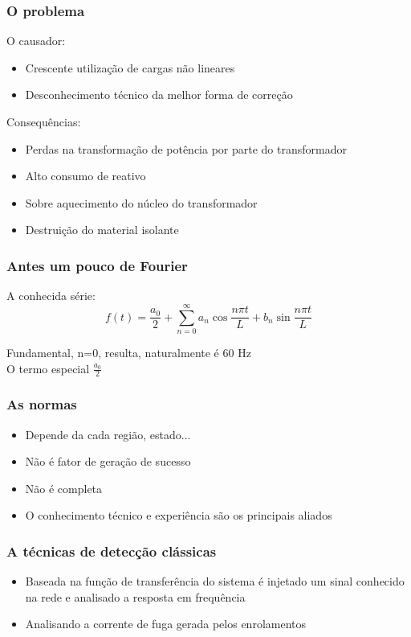 \documentclass{beamer}
\begin{document}
\begin{frame}
    \frametitle{O problema}

    O causador:
    \begin{itemize}
        \item Crescente utilização de cargas não lineares
        \item Desconhecimento técnico da melhor forma de correção
    \end{itemize}

    Consequências:
    \begin{itemize}
        \item Perdas na transformação de potência por parte do transformador
        \item Alto consumo de reativo
        \item Sobre aquecimento do núcleo do transformador
        \item Destruição do material isolante
    \end{itemize}

\end{frame}

\begin{frame}
    \frametitle{Antes um pouco de Fourier}

    A conhecida série:
    \begin{equation}
        f(t) = \frac{a_0}{2} + \sum_{n=0}^\infty{a_n \cos{\frac{n \pi t}{L} + b_n \sin{\frac{n \pi t}{L}}}}
    \end{equation}

    Fundamental, n=0, resulta, naturalmente é 60 Hz\\
    O termo especial $\frac{a_0}{2}$
\end{frame}

\begin{frame}
    \frametitle{As normas}
    
    \begin{itemize}
        \item Depende da cada região, estado...
        \item Não é fator de geração de sucesso
        \item Não é completa
        \item O conhecimento técnico e experiência são os principais aliados
    \end{itemize}

\end{frame}

\begin{frame}
    \frametitle{A técnicas de detecção clássicas}

    \begin{itemize}
        \item Baseada na função de transferência do sistema é injetado um sinal conhecido na rede e analisado a resposta em frequência
        \item Analisando a corrente de fuga gerada pelos enrolamentos
    \end{itemize}
\end{frame}
   
\end{document}
